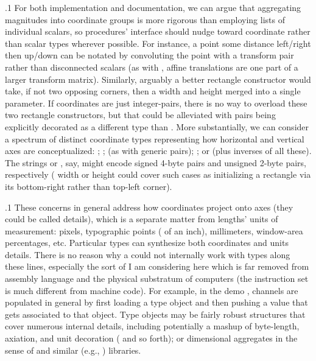 \documentclass[11pt, twocolumn]{article}
\begin{document}
\p.1{%
For both implementation and documentation, we can argue
that aggregating magnitudes into coordinate groups is more
rigorous than employing lists of individual scalars,
so procedures' interface should nudge toward coordinate
rather than scalar types wherever possible. For instance,
 a point some distance left/right then up/down
can be notated by convoluting the point with a
transform pair rather than disconnected scalars
(as with , affine translations are one
part of a larger transform matrix). Similarly,
arguably a better rectangle constructor would take,
if not two opposing corners, then a width and height
merged into a single  parameter.
If coordinates are just integer-pairs, there
is no way to overload these two rectangle constructors,
but that could be alleviated with pairs being explicitly decorated
as  \mdash{} a different type than
. More substantially, we can consider a
spectrum of distinct  coordinate types representing
how horizontal and vertical axes are conceptualized:
; ;  (as with
generic pairs); ; or 
(plus inverses of all these). The strings
 or , say, might encode signed 4-byte
 pairs and unsigned 2-byte  pairs,
respectively ( width or height could cover
such cases as initializing a rectangle via its bottom-right rather
than top-left corner).
}%

\p.1{%
These concerns in general address how coordinates
project onto axes (they could be called  details),
which is a separate matter from lengths' units of measurement:
pixels, typographic points ( of an inch), millimeters,
window-area percentages, etc. Particular types
can synthesize both coordinates and units details.
There is no reason why a  could not internally
work with types along these lines, especially the
sort of  I am considering here which is
far removed from assembly language and the physical
substratum of computers (the instruction set is
much different from machine code). For example,
in the demo , channels are populated in general
by first loading a type object and then pushing a
value that gets associated to that object.
Type objects may be fairly robust  structures
that cover numerous internal details, including
potentially a mashup of byte-length, axiation, and
unit decoration ( and so forth);
or dimensional aggregates in the sense of
 and similar (e.g., ) libraries.
}%
\end{document}
